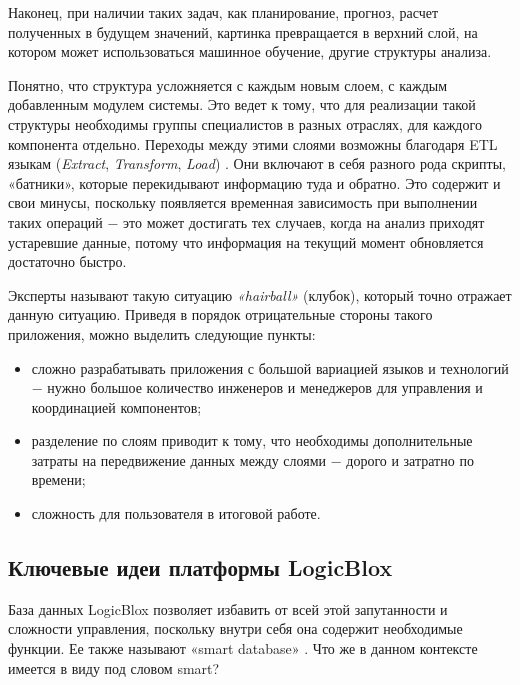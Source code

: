 Наконец, при наличии таких задач, как планирование, прогноз, расчет полученных в будущем значений, картинка превращается в верхний слой, на котором может использоваться машинное обучение, другие структуры анализа.

Понятно, что структура усложняется с каждым новым слоем, с каждым добавленным модулем системы. Это ведет к тому, что для реализации такой структуры необходимы группы специалистов в разных отраслях, для каждого компонента отдельно. Переходы между этими слоями возможны благодаря ETL языкам (\emph{Extract}, \emph{Transform}, \emph{Load}) \cite{etl_what_for}. Они включают в себя разного рода скрипты, «батники», которые перекидывают информацию туда и обратно. Это содержит и свои минусы, поскольку появляется временная зависимость при выполнении таких операций ​− это может достигать тех случаев, когда на анализ приходят устаревшие данные, потому что информация на текущий момент обновляется достаточно быстро.

Эксперты называют такую ситуацию \emph{«hairball»} (клубок), который точно отражает данную ситуацию. Приведя в порядок отрицательные стороны такого приложения, можно выделить следующие пункты:
\begin{itemize}
  \item сложно разрабатывать приложения с большой вариацией языков и технологий ​− нужно большое количество инженеров и менеджеров для управления и координацией компонентов;
  \item разделение по слоям приводит к тому, что необходимы дополнительные затраты на передвижение данных между слоями ​− дорого и затратно по времени;
  \item сложность для пользователя в итоговой работе.
\end{itemize}

\subsection{Ключевые идеи платформы LogicBlox}
\label{sec:domain:framework_key_ideas}

База данных LogicBlox позволяет избавить от всей этой запутанности и сложности управления, поскольку внутри себя она содержит необходимые функции. Ее также называют «smart database» \cite{kurt_lecture}. Что же в данном контексте имеется в виду под словом smart?

